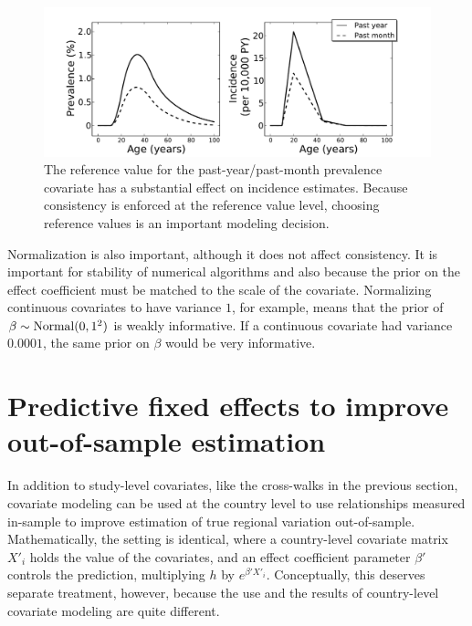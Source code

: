 \begin{figure}[h]
\begin{center}
\includegraphics[width=\textwidth]{bipolar-ref-alts.pdf}
\caption[Comparison of reference value choice on incidence estimates.]{The 
  reference value for the past-year/past-month prevalence
  covariate has a substantial effect on incidence estimates.  Because
  consistency is enforced at the reference value level, choosing reference
  values is an important modeling decision.}
\label{bipolar-ref-alts}
\end{center}
\end{figure}


Normalization is also important, although it does not affect
consistency.  It is important for stability of numerical algorithms
and also because the prior on the effect coefficient must be matched
to the scale of the covariate.  Normalizing continuous covariates to
have variance $1$, for example, means that the prior of
$\beta\sim\operatorname{Normal}(0,1^2)$ is weakly informative.  If a continuous
covariate had variance $0.0001$, the same prior on $\beta$ would be
very informative.

\section{Predictive fixed effects to improve out-of-sample estimation}

In addition to study-level covariates, like the cross-walks in the
previous section, covariate modeling can be used at the country level
to use relationships measured in-sample to improve estimation of true
regional variation out-of-sample.  Mathematically, the setting is
identical, where a country-level covariate matrix $X'_i$ holds the
value of the covariates, and an effect coefficient parameter $\beta'$
controls the prediction, multiplying $h$ by $e^{\beta' X'_i}$.
Conceptually, this deserves separate treatment, however, because the
use and the results of country-level covariate modeling are quite different.

